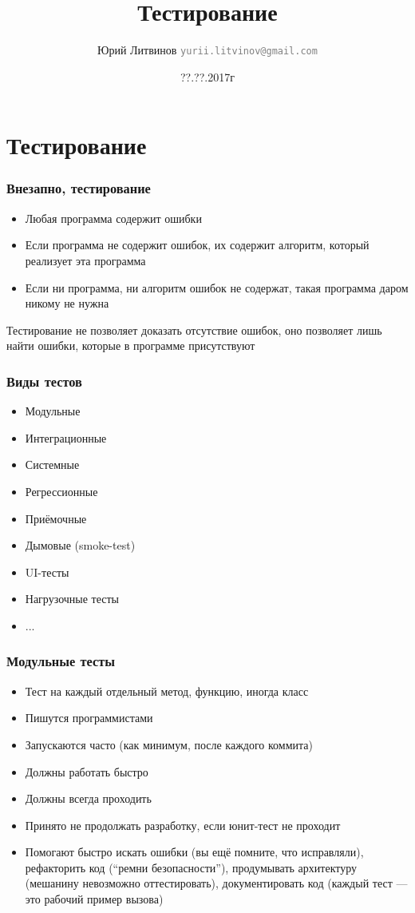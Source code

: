 \documentclass[xetex,mathserif,serif]{beamer}
\title{Тестирование}
\author[Юрий Литвинов]{Юрий Литвинов \newline \textcolor{gray}{\small\texttt{yurii.litvinov@gmail.com}}}
\date{??.??.2017г}
\begin{document}
	
	\frame{\titlepage}
	
	\section{Тестирование}

	\begin{frame}
		\frametitle{Внезапно, тестирование}
		\begin{itemize}
			\item Любая программа содержит ошибки
			\item Если программа не содержит ошибок, их содержит алгоритм, который реализует эта программа
			\item Если ни программа, ни алгоритм ошибок не содержат, такая программа даром никому не нужна
		\end{itemize}
		Тестирование не позволяет доказать отсутствие ошибок, оно позволяет лишь найти ошибки, которые в программе присутствуют
	\end{frame}

	\begin{frame}
		\frametitle{Виды тестов}
		\begin{itemize}
			\item Модульные
			\item Интеграционные
			\item Системные
		\end{itemize}
		\begin{itemize}
			\item Регрессионные
			\item Приёмочные
			\item Дымовые (smoke-test)
		\end{itemize}
		\begin{itemize}
			\item UI-тесты
			\item Нагрузочные тесты
			\item ...
		\end{itemize}
	\end{frame}

	\begin{frame}
		\frametitle{Модульные тесты}
		\begin{itemize}
			\item Тест на каждый отдельный метод, функцию, иногда класс
			\item Пишутся программистами
			\item Запускаются часто (как минимум, после каждого коммита)
			\item Должны работать быстро
			\item Должны всегда проходить 
			\item Принято не продолжать разработку, если юнит-тест не проходит
			\item Помогают быстро искать ошибки (вы ещё помните, что исправляли), рефакторить код (``ремни безопасности''), продумывать архитектуру (мешанину невозможно оттестировать), документировать код (каждый тест --- это рабочий пример вызова)
		\end{itemize}
	\end{frame}
\end{document}
